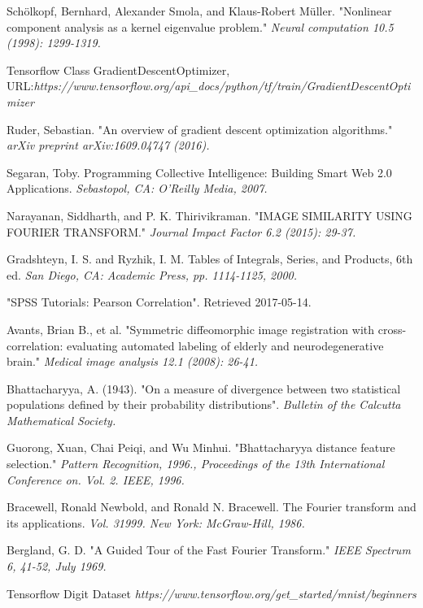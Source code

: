 \documentclass[12pt]{report} %
\begin{document}
\begin{thebibliography}{}
	Schölkopf, Bernhard, Alexander Smola, and Klaus-Robert Müller. "Nonlinear component analysis as a kernel eigenvalue problem." \textit{Neural computation 10.5 (1998): 1299-1319.}

	Tensorflow Class GradientDescentOptimizer, \\
    URL:\textit{https://www.tensorflow.org/api\_docs/python/tf/train/GradientDescentOptimizer}

	Ruder, Sebastian. "An overview of gradient descent optimization algorithms." \textit{arXiv preprint arXiv:1609.04747 (2016).}

	Segaran, Toby. Programming Collective Intelligence: Building Smart Web 2.0 Applications. \textit{Sebastopol, CA: O'Reilly Media, 2007.}

	Narayanan, Siddharth, and P. K. Thirivikraman. "IMAGE SIMILARITY USING FOURIER TRANSFORM." \textit{Journal Impact Factor 6.2 (2015): 29-37.}

	Gradshteyn, I. S. and Ryzhik, I. M. Tables of Integrals, Series, and Products, 6th ed. \textit{San Diego, CA: Academic Press, pp. 1114-1125, 2000.}

	"SPSS Tutorials: Pearson Correlation". Retrieved 2017-05-14.

	Avants, Brian B., et al. "Symmetric diffeomorphic image registration with cross-correlation: evaluating automated labeling of elderly and neurodegenerative brain." \textit{Medical image analysis 12.1 (2008): 26-41.}

	Bhattacharyya, A. (1943). "On a measure of divergence between two statistical populations defined by their probability distributions". \textit{Bulletin of the Calcutta Mathematical Society.}

	Guorong, Xuan, Chai Peiqi, and Wu Minhui. "Bhattacharyya distance feature selection." \textit{Pattern Recognition, 1996., Proceedings of the 13th International Conference on. Vol. 2. IEEE, 1996.}

	Bracewell, Ronald Newbold, and Ronald N. Bracewell. The Fourier transform and its applications. \textit{Vol. 31999. New York: McGraw-Hill, 1986.}

	Bergland, G. D. "A Guided Tour of the Fast Fourier Transform." \textit{IEEE Spectrum 6, 41-52, July 1969.}

	Tensorflow Digit Dataset
	\textit{https://www.tensorflow.org/get\_started/mnist/beginners}


\end{thebibliography}
\end{document}
